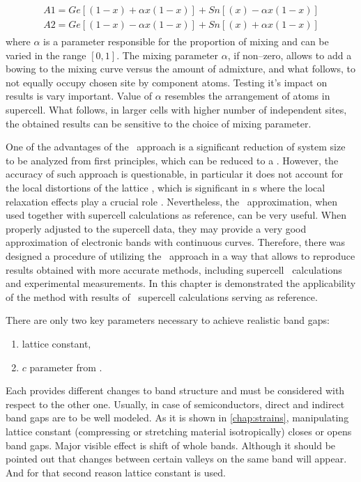 \begin{align}
\label{Eq:mixing}
\begin{split}
A1=Ge[(1-x)+\alpha x(1-x)] + Sn[(x)-\alpha x(1-x)]\\
A2=Ge[(1-x)-\alpha x(1-x)] + Sn[(x)+\alpha x(1-x)]
\end{split}
\end{align}
where $\alpha$ is a parameter responsible for the proportion of mixing and can be varied in the range $[0,1]$.
The mixing parameter $\alpha$, if non--zero, allows to add a bowing to the mixing curve versus the amount of admixture, and what follows, to not equally occupy chosen site by component atoms.
Testing it's impact on results is vary important.
Value of $\alpha$ resembles the arrangement of atoms in supercell.
What follows, in larger cells with higher number of independent sites, the obtained results can be sensitive to the choice of mixing parameter.

One of the advantages of the \AM\ approach is a significant reduction of system size to be analyzed from first principles, which can be reduced to a \prim.
However, the accuracy of such approach is questionable, in particular it does not account for the local distortions of the lattice \cite{ingan}, which is significant in \HMA s where the local relaxation effects play a crucial role \cite{Polak_2015}.
Nevertheless, the \AM\ approximation, when used together with supercell calculations \cite{Polak_2017} as reference, can be very useful.
When properly adjusted to the supercell data, they may provide a very good approximation of electronic bands with continuous curves.
Therefore, there was designed a procedure of utilizing the \AM\ approach in a way that allows to reproduce results obtained with more accurate methods, including supercell \DFT\ calculations and experimental measurements.
In this chapter is demonstrated the applicability of the method with results of \DFT\ supercell calculations serving as reference.

There are only two key parameters necessary to achieve realistic band gaps:
\begin{enumerate}
    \item lattice constant,
    \item $c$ parameter from \mBJLDA.
\end{enumerate}

Each provides different changes to band structure and must be considered with respect to the other one.
Usually, in case of semiconductors, direct and indirect band gaps are to be well modeled.
As it is shown in \ref{chap:strains}, manipulating lattice constant (compressing or stretching material isotropically) closes or opens band gaps.
Major visible effect is shift of whole bands.
Although it should be pointed out that changes between certain valleys on the same band will appear.
And for that second reason lattice constant is used.

